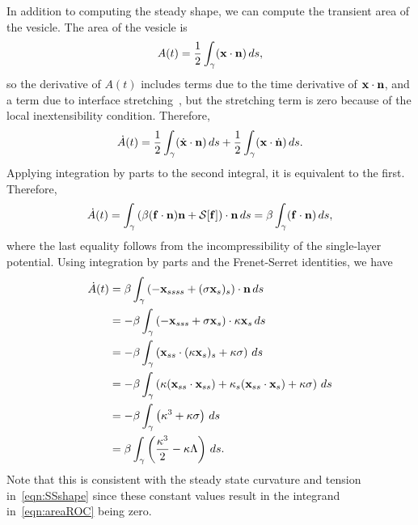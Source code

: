 \documentclass[9pt,twocolumn,twoside,lineno]{pnas-new}
\begin{document}
In addition to computing the steady shape, we can compute the transient
area of the vesicle. The area of the vesicle is
\begin{align}
  A(t) = \frac{1}{2}\int_{\gamma} (\mathbf{x} \cdot \mathbf{n})\, ds,
  \label{eqn:area}
\end{align}
so the derivative of $A(t)$ includes terms due to the time derivative of
$\mathbf{x} \cdot \mathbf{n}$, and a term due to interface
stretching~\cite{lai-tse-hua2008}, but the stretching term is zero
because of the local inextensibility condition. Therefore,
\begin{align}
  \dot{A}(t) =
  \frac{1}{2} \int_{\gamma} (\dot{\mathbf{x}} \cdot \mathbf{n})\, ds  + 
  \frac{1}{2} \int_{\gamma} (\mathbf{x} \cdot \dot{\mathbf{n}})\, ds.
\end{align}
Applying integration by parts to the second integral, it is equivalent
to the first.
Therefore,
\begin{align}
  \dot{A}(t) = \int_\gamma \left(\beta (\mathbf{f} \cdot \mathbf{n})\mathbf{n} 
    + \mathcal{S}[\mathbf{f}]\right) \cdot \mathbf{n}\, ds 
  = \beta \int_\gamma (\mathbf{f} \cdot \mathbf{n})\, ds,
\end{align}
where the last equality follows from the incompressibility of the
single-layer potential.  Using integration by parts and the
Frenet-Serret identities, we have
\begin{align}
  \dot{A}(t) &= \beta \int_\gamma \left( -\mathbf{x}_{ssss} + 
    (\sigma \mathbf{x}_s)_s \right) \cdot \mathbf{n} \, ds \\
  &= -\beta \int_\gamma \left(-\mathbf{x}_{sss} + \sigma \mathbf{x}_s 
    \right) \cdot \kappa \mathbf{x}_s \, ds \\
  &= -\beta \int_\gamma \left(\mathbf{x}_{ss} \cdot 
    (\kappa \mathbf{x}_s)_s + \kappa \sigma \right) \, ds \\
  &= -\beta \int_\gamma \left(\kappa (\mathbf{x}_{ss} \cdot \mathbf{x}_{ss}) + 
    \kappa_s (\mathbf{x}_{ss} \cdot \mathbf{x}_s) + \kappa \sigma \right) 
    \, ds \\
  &= -\beta \int_\gamma \left(\kappa^3 + \kappa \sigma \right) 
    \, ds \\
  &= \beta \int_\gamma \left(
    \frac{\kappa^3}{2} - \kappa \Lambda \right) \, ds.
  \label{eqn:areaROC}
\end{align}
Note that this is consistent with the steady state curvature and tension
in~\eqref{eqn:SSshape} since these constant values result in the
integrand in~\eqref{eqn:areaROC} being zero.
\end{document}
